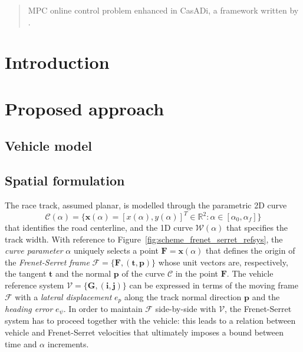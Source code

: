 \documentclass[conference]{IEEEtran} %
\renewcommand{\vec}[1]{\boldsymbol{#1}}
\begin{document}

\begin{abstract}
MPC online control problem enhanced in CasADi, a framework written by \citet{Andersson2019}.
\end{abstract}

\IEEEpeerreviewmaketitle

\section{Introduction}

\textcolor{gray}{\lipsum[1]}


\section{Proposed approach} %

\textcolor{gray}{\lipsum[2]}

\subsection{Vehicle model}

\textcolor{gray}{\lipsum[3]}

\subsection{Spatial formulation}

The race track, assumed planar, is modelled through the parametric 2D curve
\begin{equation}
\mathcal C(\alpha) = \{ \vec x (\alpha) = [x(\alpha), y(\alpha)]^T \in \mathbb{R}^2 : \alpha \in [\alpha_0, \alpha_f] \}
\end{equation}
%
that identifies the road centerline, and the 1D curve $\mathcal W(\alpha)$ that specifies the track width.
With reference to Figure~\ref{fig:scheme_frenet_serret_refsys}, the \emph{curve parameter} $\alpha$ uniquely selects a point $\vec F = \vec x(\alpha)$ that defines the origin of the \emph{Frenet-Serret frame} $\mathcal F = \{ \vec F, (\vec t, \vec p) \}$ whose unit vectors are, respectively, the tangent $\vec t$ and the normal $\vec p$ of the curve $\mathcal C$ in the point $\vec F$.
%
The vehicle reference system $\mathcal V = \{ \vec G, (\vec i, \vec j) \}$ can be expressed in terms of the moving frame $\mathcal F$ with a \emph{lateral displacement} $e_p$ along the track normal direction $\vec p$ and the \emph{heading error} $e_\psi$.
In order to maintain $\mathcal F$ side-by-side with $\mathcal V$, the Frenet-Serret system has to proceed together with the vehicle: this leads to a relation between vehicle and Frenet-Serret velocities that ultimately imposes a bound between time and $\alpha$ increments.
\end{document}
